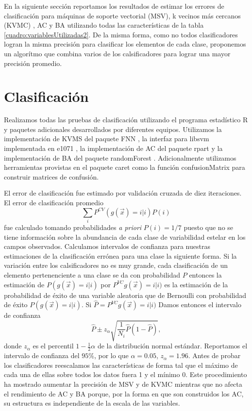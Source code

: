 \documentclass[letterpaper,12pt]{book}
\begin{document}
En la siguiente sección reportamos los resultados de estimar los errores de clasificación para máquinas de soporte vectorial (MSV), k vecinos más cercanos (KVMC) , AC y BA utilizando todas las características de la tabla \ref{cuadro:variablesUtilizadas2}. De la misma forma, como no todos clasificadores logran la misma precisión para clasificar los elementos de cada clase, proponemos un algorítmo que combina varios de los calsificadores para lograr una mayor precisión promedio. 


\section{Clasificación}

Realizamos todas las pruebas de clasificación utilizando el programa estadístico R\cite{rbase} y paquetes adicionales desarrollados por diferentes equipos. Utilizamos la implementación de KVMS del paquete FNN \cite{FNN}, la interfaz para libsvm \cite{chang_libsvm:_2011} implementada en e1071 \cite{e1071}, la implementación de AC del paquete rpart \cite{rpart} y la implementación de BA del paquete randomForest \cite{randomForest}. Adicionalmente utilizamos herramientas provistas en el paquete caret \cite{caret} como la función confusionMatrix para construir matrices de confusión.


El error de clasificación fue estimado por validación cruzada de diez iteraciones. El error de clasificación promedio 
\begin{equation}
\sum_{i}P^{CV}(g(\vec{x}) = i | i)P(i)
\end{equation} 
fue calculado tomando probabilidades \textit{a priori} $P(i) = 1/7$ puesto que no se tiene información sobre la abundancia de cada clase de variabilidad estelar en los campos observados. Calculamos intervalos de confianza para nuestras estimaciones de la clasificación errónea para una clase la siguiente forma. Si la variación entre los calsificadores no es muy grande, cada clasificación de un elemento pertenenciente a una clase se da con probabilidad $P$ entonces la estimación de $P(g(\vec{x})=i|i)$ por $P^{VC}g(\vec{x})=i|i)$ es la estimación de la probabilidad de éxito de una variable aleatoria que de Bernoulli con probabilidad de éxito $P(g(\vec{x})=i|i)$. Si $\hat{P} = P^{VC}g(\vec{x})=i|i)$ Damos entonces el intervalo de confianza
\begin{equation}
  \hat{P} \pm z_{\alpha} \sqrt{\frac{1}{N_i} \hat{P}(1-\hat{P})},
\end{equation}
donde $z_\alpha$ es el percentil $1-\frac{1}{2}\alpha$ de la distribución normal estándar. Reportamos el intervalo de confianza del $95\%$, por lo que $\alpha = 0.05$, $z_\alpha = 1.96$. 
Antes de probar los clasificadores reescalamos las características de forma tal que el máximo de cada una de ellas sobre todos los datos fuera 1 y el mínimo 0. Este procedimiento ha mostrado aumentar la precisión de MSV y de KVMC mientras que no afecta el rendimiento de AC y BA porque, por la forma en que son construidos los AC, su estructura es independiente de la escala de las variables. 
\end{document}
